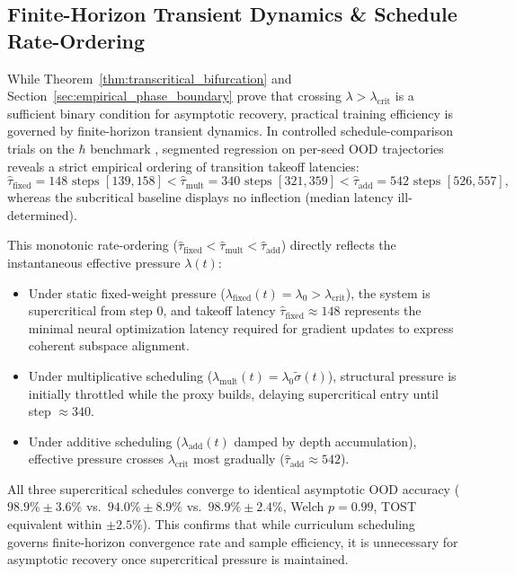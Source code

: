 \documentclass{article}
\theoremstyle{plain}
\theoremstyle{definition}
\begin{document}
\subsection{Finite-Horizon Transient Dynamics \& Schedule Rate-Ordering}
\label{sec:rate_ordering}
While Theorem~\ref{thm:transcritical_bifurcation} and Section~\ref{sec:empirical_phase_boundary} prove that crossing $\lambda > \lambda_{\text{crit}}$ is a sufficient binary condition for asymptotic recovery, practical training efficiency is governed by finite-horizon transient dynamics. In controlled schedule-comparison trials on the $\hbar$ benchmark \citep{Basri2026CompositionalPreprint}, segmented regression on per-seed OOD trajectories reveals a strict empirical ordering of transition takeoff latencies:
\begin{equation}
    \hat{\tau}_{\text{fixed}} = 148\text{ steps } [139, 158] < \hat{\tau}_{\text{mult}} = 340\text{ steps } [321, 359] < \hat{\tau}_{\text{add}} = 542\text{ steps } [526, 557],
    \label{eq:rate_ordering}
\end{equation}
whereas the subcritical baseline displays no inflection (median latency ill-determined).

This monotonic rate-ordering ($\hat{\tau}_{\text{fixed}} < \hat{\tau}_{\text{mult}} < \hat{\tau}_{\text{add}}$) directly reflects the instantaneous effective pressure $\lambda(t)$:
\begin{itemize}[noitemsep]
    \item Under static fixed-weight pressure ($\lambda_{\text{fixed}}(t) = \lambda_0 > \lambda_{\text{crit}}$), the system is supercritical from step 0, and takeoff latency $\hat{\tau}_{\text{fixed}} \approx 148$ represents the minimal neural optimization latency required for gradient updates to express coherent subspace alignment.
    \item Under multiplicative scheduling ($\lambda_{\text{mult}}(t) = \lambda_0 \tilde{\sigma}(t)$), structural pressure is initially throttled while the proxy builds, delaying supercritical entry until step $\approx 340$.
    \item Under additive scheduling ($\lambda_{\text{add}}(t)$ damped by depth accumulation), effective pressure crosses $\lambda_{\text{crit}}$ most gradually ($\hat{\tau}_{\text{add}} \approx 542$).
\end{itemize}
All three supercritical schedules converge to identical asymptotic OOD accuracy ($98.9\% \pm 3.6\%$ vs.\ $94.0\% \pm 8.9\%$ vs.\ $98.9\% \pm 2.4\%$, Welch $p = 0.99$, TOST equivalent within $\pm 2.5\%$). This confirms that while curriculum scheduling governs finite-horizon convergence rate and sample efficiency, it is unnecessary for asymptotic recovery once supercritical pressure is maintained.
\end{document}

